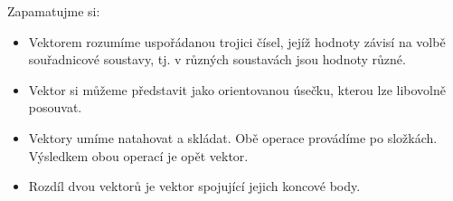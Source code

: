     \begin{tcnote}      
      Zapamatujme si:
      \begin{itemize}[noitemsep]
        \item Vektorem rozumíme uspořádanou trojici čísel, jejíž hodnoty závisí na volbě
              souřadnicové soustavy, tj. v různých soustavách jsou hodnoty různé.
        \item Vektor si můžeme představit jako orientovanou úsečku, kterou lze libovolně posouvat.  
        \item Vektory umíme natahovat a skládat. Obě operace provádíme po složkách. Výsledkem obou
              operací je opět vektor. 
        \item Rozdíl dvou vektorů je vektor spojující jejich koncové body. 
      \end{itemize}
    \end{tcnote}

